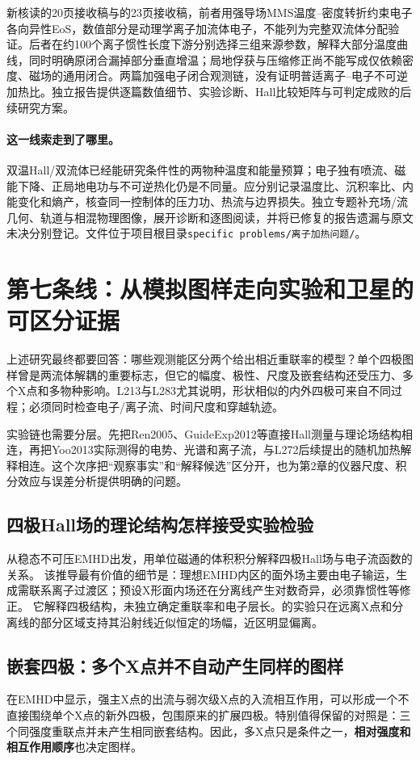 \documentclass[UTF8,a4paper,11pt,openany,fontset=fandol]{ctexbook}
\begin{document}
新核读\citet{Wetherton2019}的20页接收稿与\citet{Wetherton2021}的23页接收稿，前者用强导场MMS温度--密度转折约束电子各向异性EoS，数值部分是动理学离子加流体电子，不能列为完整双流体分配验证。后者在约100个离子惯性长度下游分别选择三组来源参数，解释大部分温度曲线，同时明确原闭合漏掉部分垂直增温；局地俘获与压缩修正尚不能写成仅依赖密度、磁场的通用闭合。两篇加强电子闭合观测链，没有证明普适离子--电子不可逆加热比。独立报告提供逐篇数值细节、实验诊断、Hall比较矩阵与可判定成败的后续研究方案。

\paragraph{这一线索走到了哪里。}双温Hall/双流体已经能研究条件性的两物种温度和能量预算；电子独有喷流、磁能下降、正局地电功与不可逆热化仍是不同量。应分别记录温度比、沉积率比、内能变化和熵产，核查同一控制体的压力功、热流与边界损失。独立专题补充场/流几何、轨道与相混物理图像，展开诊断和逐图阅读，并将已修复的报告遗漏与原文未决分别登记。文件位于项目根目录\texttt{specific problems/离子加热问题/}。

\section{第七条线：从模拟图样走向实验和卫星的可区分证据}\label{story:diagnostic}
上述研究最终都要回答：哪些观测能区分两个给出相近重联率的模型？单个四极图样曾是两流体解耦的重要标志，但它的幅度、极性、尺度及嵌套结构还受压力、多个X点和多物种影响。L213与L283尤其说明，形状相似的内外四极可来自不同过程；必须同时检查电子/离子流、时间尺度和穿越轨迹。

实验链也需要分层。先把Ren2005、GuideExp2012等直接Hall测量与理论场结构相连，再把Yoo2013实际测得的电势、光谱和离子流，与L272后续提出的随机加热解释相连。这个次序把“观察事实”和“解释候选”区分开，也为第2章的仪器尺度、积分效应与误差分析提供明确的问题。

\subsection{四极Hall场的理论结构怎样接受实验检验}
\citet{L089}从稳态不可压EMHD出发，用单位磁通的体积积分解释四极Hall场与电子流函数的关系。
该推导最有价值的细节是：理想EMHD内区的面外场主要由电子输运，生成需联系离子过渡区；预设X形面内场还在分离线产生对数奇异，必须靠惯性等修正。
它解释四极结构，未独立确定重联率和电子层长。\citet{L119}的实验只在远离X点和分离线的部分区域支持其沿射线近似恒定的场幅，近区明显偏离。

\subsection{嵌套四极：多个X点并不自动产生同样的图样}\label{sec:synthesis-nested}
\citet{L213}在EMHD中显示，强主X点的出流与弱次级X点的入流相互作用，可以形成一个不直接围绕单个X点的新外四极，包围原来的扩展四极。特别值得保留的对照是：三个同强度重联点并未产生相同嵌套结构。因此，多X点只是条件之一，\textbf{相对强度和相互作用顺序}也决定图样。
\end{document}
